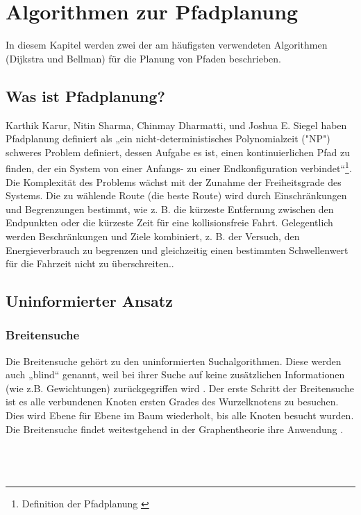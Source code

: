 \chapter{Algorithmen zur Pfadplanung}
In diesem Kapitel werden zwei der am häufigsten verwendeten Algorithmen (Dijkstra und Bellman) für die Planung von Pfaden beschrieben.

\section{Was ist Pfadplanung?}
\label{Was ist Pfadplanung?}
Karthik Karur, Nitin Sharma, Chinmay Dharmatti, und Joshua E. Siegel haben Pfadplanung definiert als „ein nicht-deterministisches Polynomialzeit ("NP") schweres Problem definiert, dessen Aufgabe es ist, einen kontinuierlichen Pfad zu finden, der ein System von einer Anfangs- zu einer Endkonfiguration verbindet“\footnote{Definition der Pfadplanung \cite{Karur2021}}.
\newline
\newline
Die Komplexität des Problems wächst mit der Zunahme der Freiheitsgrade des Systems. Die zu wählende Route (die beste Route) wird durch Einschränkungen und Begrenzungen bestimmt, wie z. B. die kürzeste Entfernung zwischen den Endpunkten oder die kürzeste Zeit für eine kollisionsfreie Fahrt. Gelegentlich werden Beschränkungen und Ziele kombiniert, z. B. der Versuch, den Energieverbrauch zu begrenzen und gleichzeitig einen bestimmten Schwellenwert für die Fahrzeit nicht zu überschreiten.\cite{Karur2021}.

\section{Uninformierter Ansatz}
\label{Uninformierter Ansatz}
\subsection{Breitensuche}
\label{Breitensuche}
Die Breitensuche gehört zu den uninformierten Suchalgorithmen. Diese werden auch „blind“ genannt, weil bei ihrer 
Suche auf keine zusätzlichen Informationen (wie z.B. Gewichtungen) zurückgegriffen wird \cite{Russell:10b}.
Der erste Schritt der Breitensuche ist es alle verbundenen Knoten ersten Grades des Wurzelknotens zu besuchen.
Dies wird Ebene für Ebene im Baum wiederholt, bis alle Knoten besucht wurden. 
Die Breitensuche findet weitestgehend in der Graphentheorie ihre Anwendung \cite{Russell:10b}.
\\
\\
\\
\\
